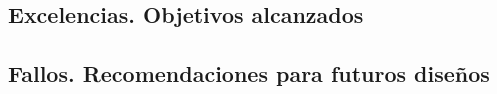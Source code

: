 
  \subsection{Excelencias. Objetivos alcanzados}  

  \newpage



  \subsection{Fallos. Recomendaciones para futuros diseños}  

  \newpage


